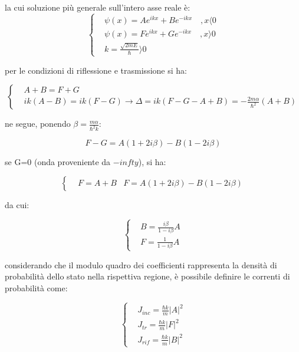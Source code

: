 \documentclass{report}
\begin{document}
la cui soluzione più generale sull'intero asse reale è:
\begin{equation}
  \left\{
  \begin{aligned}
     & \psi(x)=Ae^{ikx}+Be^{-ikx} \quad , x\langle 0 \\
     & \psi(x)=Fe^{ikx}+Ge^{-ikx} \quad , x\rangle 0 \\
     & k=\frac{\sqrt{2mE}}{\hbar}\rangle 0
  \end{aligned}
  \right.
\end{equation}

per le condizioni di riflessione e trasmissione si ha:

\begin{equation}
  \left\{
  \begin{aligned}
     & A+B=F+G                                                                        \\
     & ik(A-B)=ik(F-G) \rightarrow \Delta= ik(F-G-A+B)=-\frac{2m\alpha}{\hbar^2}(A+B)
  \end{aligned}
  \right.
\end{equation}

ne segue, ponendo $\beta=\frac{m\alpha}{\hbar^2k}$:

\begin{equation}
  F-G=A(1+2i\beta)-B(1-2i\beta)
\end{equation}

se G=0 (onda proveniente da $-infty$), si ha:

\begin{equation}
  \left\{
  \begin{aligned}
     & F=A+B
     & F= A(1+2i\beta)-B(1-2i\beta)
  \end{aligned}
  \right.
\end{equation}

da cui:

\begin{equation}
  \left\{
  \begin{aligned}
     & B= \frac{i\beta}{1-i\beta}A \\
     & F= \frac{1}{1-i\beta}A
  \end{aligned}
  \right.
\end{equation}

considerando che il modulo quadro dei coefficienti rappresenta la densità di probabilità dello stato nella rispettiva regione,
è possibile definire le correnti di probabilità come:

\begin{equation}
  \left\{
  \begin{aligned}
     & J_{inc}= \frac{\hbar k}{m}|A|^2 \\
     & J_{tr}= \frac{\hbar k}{m}|F|^2  \\
     & J_{rif}= \frac{\hbar k}{m}|B|^2
  \end{aligned}
  \right.
\end{equation}
\end{document}
